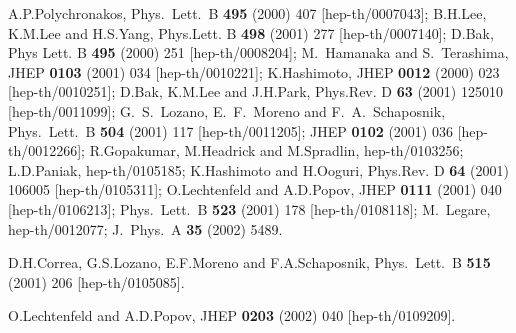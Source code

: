 \documentclass[a4paper,11pt]{article}
\numberwithin{equation}{section}
\begin{document}
\begin{thebibliography}{99}
A.P.Polychronakos,
Phys.\ Lett.\ B {\bf 495} (2000) 407
[hep-th/0007043];
B.H.Lee, K.M.Lee and H.S.Yang,
Phys.Lett. B {\bf 498} (2001) 277
[hep-th/0007140];
D.Bak,
Phys Lett. B {\bf 495} (2000) 251
[hep-th/0008204];
M.~Hamanaka and S.~Terashima,
JHEP {\bf 0103} (2001) 034
[hep-th/0010221];
K.Hashimoto,
JHEP {\bf 0012} (2000) 023
[hep-th/0010251];
D.Bak, K.M.Lee and J.H.Park,
Phys.Rev. D {\bf 63} (2001) 125010
[hep-th/0011099];
G.~S.~Lozano, E.~F.~Moreno and F.~A.~Schaposnik,
Phys.\ Lett.\ B {\bf 504} (2001) 117
[hep-th/0011205];
JHEP {\bf 0102} (2001) 036
[hep-th/0012266];
R.Gopakumar, M.Headrick and M.Spradlin,
hep-th/0103256;
L.D.Paniak,
hep-th/0105185;
K.Hashimoto and H.Ooguri,
Phys.Rev. D {\bf 64} (2001) 106005
[hep-th/0105311];
O.Lechtenfeld and A.D.Popov,
JHEP {\bf 0111} (2001) 040
[hep-th/0106213];
Phys.\ Lett.\ B {\bf 523} (2001) 178
[hep-th/0108118];
M.~Legare, hep-th/0012077;
J.\ Phys.\ A {\bf 35} (2002) 5489.


D.H.Correa, G.S.Lozano, E.F.Moreno and F.A.Schaposnik,
Phys.\ Lett.\ B {\bf 515} (2001) 206 [hep-th/0105085].


O.Lechtenfeld and A.D.Popov,
JHEP {\bf 0203} (2002) 040 [hep-th/0109209].



\end{thebibliography}
\end{document}
